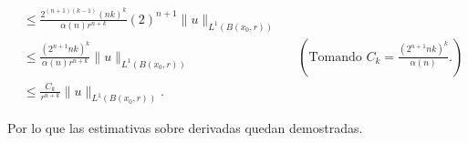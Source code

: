 \begin{homeworkProblem}
\begin{solucion}
\begin{itemize}
\begin{align*}
          &\leq \frac{2^{(n+1)(k-1)}(nk)^k}{\alpha(n)r^{n+k}}(2)^{n+1}\|u\|_{L^{1}(B(x_0,r))}\\
          &\leq \frac{(2^{n+1}nk)^{k}}{\alpha(n)r^{n+k}}\|u\|_{L^{1}(B(x_0,r))} &&\left( \text{Tomando $C_k=\frac{(2^{n+1}nk)^k}{\alpha(n)}$.} \right)\\
          &\leq \frac{C_k}{r^{n+k}}\|u\|_{L^{1}(B(x_0,r))}.
        \end{align*}
    \end{itemize}
    Por lo que las estimativas sobre derivadas quedan demostradas.
    \demostrado
  \end{solucion}
\end{homeworkProblem}
